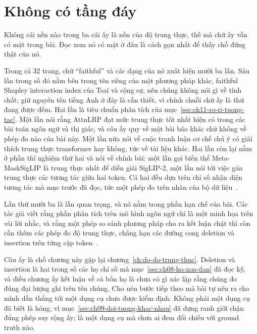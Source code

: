 \section{Không có tầng đáy}
\label{sec:ch11-khong-co-tang-day}

%
Không cái nền nào trong ba cái ấy là nền của độ trung thực, thế mà chữ ấy vẫn
có mặt trong bài. Đọc xem nó có mặt ở đâu là cách gọn nhất để thấy chỗ đứng
thật của nó.

Trong cả 32 trang, chữ \enquote{faithful} và các dạng của nó xuất hiện mười ba
lần. Sáu lần trong số đó nằm bên trong tên riêng của một phương pháp khác,
faithful Shapley interaction index của Tsai và cộng sự, nên chúng không nói gì
về tính chất; giữ nguyên tên tiếng Anh ở đây là cần thiết, vì chính chuỗi chữ
ấy là thứ đang được đếm. Hai lần là tiêu chuẩn phân tích của
mục~\ref{sec:ch11-ro-ri-tuong-tac}. Một lần nói rằng AttnLRP đạt mức trung thực
tốt nhất hiện có trong các bài toán ngôn ngữ và thị giác, và câu ấy quy về một
bài báo khác chứ không về phép đo nào của bài này. Một lần nữa nói về cuộc
tranh luận cơ chế chú ý có giải thích trung thực transformer hay không, tức về
tài liệu khác. Hai lần còn lại nằm ở phần thí nghiệm thứ hai và nói về chính
bài: một lần gọi biến thể Meta-MaskSigLIP là trung thực nhất để diễn giải
SigLIP-2, một lần nói tới việc gán trung thực các tương tác giữa hai token. Cả
hai đều dựa trên chỉ số nhận diện tương tác mà mục trước đã đọc, tức một phép
đo trên nhãn của bộ dữ liệu~\autocite{p23metagame}.

Lần thứ mười ba là lần quan trọng, và nó nằm trong phần hạn chế của bài. Các
tác giả viết rằng phần phân tích trên mô hình ngôn ngữ chỉ là một minh họa trên
vài lời nhắc, và rằng một phép so sánh phương pháp cho ra kết luận chặt thì còn
cần thêm các phép đo độ trung thực, chẳng hạn các đường cong deletion và
insertion trên từng cặp token~\autocite{p23metagame}.

Câu ấy là chỗ chương này gặp lại chương~\ref{ch:do-do-trung-thuc}. Deletion và
insertion là hai trong số các họ chỉ số mà mục~\ref{sec:ch08-ho-xoa-dan} đã đọc
kỹ, và điều chương ấy kết luận về cả bốn họ là chưa có gì xác lập rằng chúng đo
đúng đại lượng ghi trên tên chúng. Cho nên bước tiếp theo mà bài tự nêu ra cho
mình dẫn thẳng tới một dụng cụ chưa được kiểm định. Không phải một dụng cụ đã
biết là hỏng, vì mục~\ref{sec:ch09-doi-tuong-khac-nhau} đã dựng ranh giới chặn
đúng phép suy rộng ấy; là một dụng cụ mà chưa ai đem đối chiếu với ground truth
nào.

